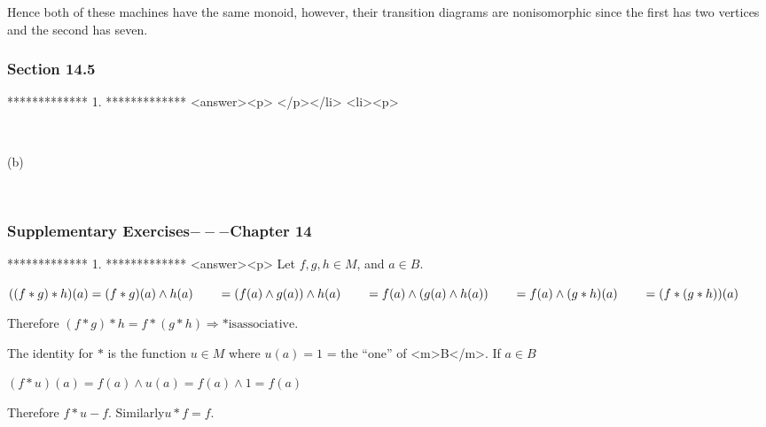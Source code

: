 Hence both of these machines have the same monoid, however, their transition diagrams are nonisomorphic since the first has two vertices and the
second has seven.


\subsubsection{Section 14.5}

*************
1.
*************
<answer><p> </p></li>
<li><p>

\begin{doublespace}
\noindent\(\pmb{}\)
\end{doublespace}



 (b)

\begin{doublespace}
\noindent\(\pmb{}\)
\end{doublespace}


\subsubsection{Supplementary Exercises$---$Chapter 14}

*************
1.
*************
<answer><p>   Let \(f, g, h \in  M\), and \(a \in  B\).



\(((f*g)*h)(a) = (f*g)(a) \land  h(a)\\
\\
\quad \quad = (f(a)\land g(a))\land h(a)\\
\\
\quad \quad = f(a) \land ( g(a) \land  h(a))\\
\\
\quad \quad = f(a) \land  (g * h)(a)\\
\\
\quad \quad = (f * (g * h))(a)\)



Therefore \((f * g) * h =f * (g * h) \Rightarrow  * \text{is} \text{associative}\).



The identity for \(*\) is the function \(u \in  M\) where \(u (a) = 1\) = the {``}one{''} of <m>B</m>. If \(a \in  B\)



\((f*u)(a) =f(a)\land u(a) = f(a)\land 1 = f(a)\)



Therefore \(f * u - f\). Similarly\(u * f =f\).



